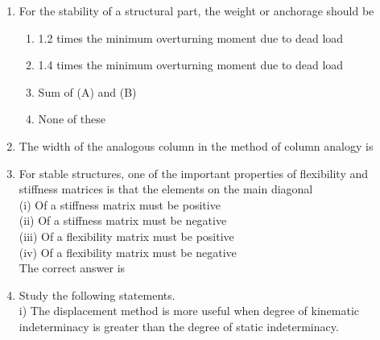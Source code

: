 \documentclass[11pt,a4paper]{article}
\begin{document}
\begin{enumerate}
\item{For the stability of a structural part, the weight or anchorage should be}
\begin{enumerate}[label=\Alph*.]
\item{1.2 times the minimum overturning moment due to dead load}
\item{1.4 times the minimum overturning moment due to dead load}
\item{Sum of (A) and (B)}
\item{None of these}
\end{enumerate}
\item{The width of the analogous column in the method of column analogy is}
\\
\item{For stable structures, one of the important properties of flexibility and stiffness matrices is that the elements on the main diagonal \\
 (i) Of a stiffness matrix must be positive \\
 (ii) Of a stiffness matrix must be negative \\
 (iii) Of a flexibility matrix must be positive \\
 (iv) Of a flexibility matrix must be negative \\
The correct answer is}
\\
\item{Study the following statements. \\
i) The displacement method is more useful when degree of kinematic indeterminacy is greater than the degree of static indeterminacy. \\
}
\end{enumerate}
\end{document}
